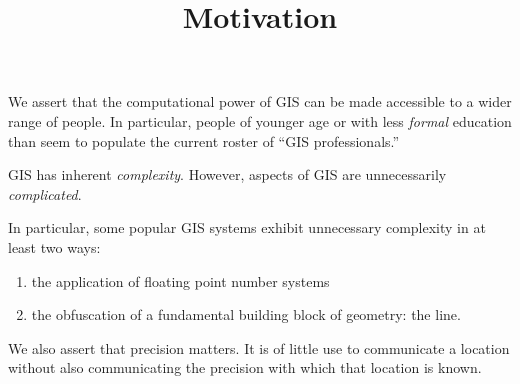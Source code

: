 \documentclass{article}
\title{Motivation}
\begin{document}
\maketitle
We assert that the computational power of GIS can be made accessible to a wider range of
people.
In particular, people of younger age or with less \emph{formal} education than seem to populate the current
roster of ``GIS professionals.''

GIS has inherent \emph{complexity}.
However, aspects of GIS are unnecessarily \emph{complicated}.

In particular, some popular GIS systems exhibit unnecessary complexity in at least two ways:
\begin{enumerate}
\item the application of floating point number systems
\item the obfuscation of a fundamental building block of geometry: the line.
\end{enumerate}
We also assert that precision matters.
It is of little use to communicate a location without also communicating the precision with which that location is known.
\end{document}
